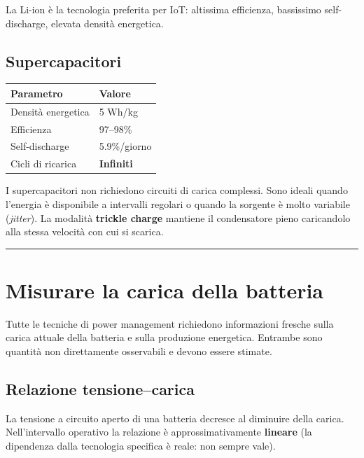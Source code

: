 \documentclass[
  italian,
  openany]{book}
\newcounter{none} %
\begin{document}
La Li-ion è la tecnologia preferita per IoT: altissima efficienza,
bassissimo self-discharge, elevata densità energetica.

\subsection{Supercapacitori}\label{supercapacitori}

{\def\LTcaptype{none} %
\begin{longtable}[]{@{}ll@{}}
\toprule\noalign{}
Parametro & Valore \\
\midrule\noalign{}
\endhead
\bottomrule\noalign{}
\endlastfoot
Densità energetica & 5 Wh/kg \\
Efficienza & 97--98\% \\
Self-discharge & 5.9\%/giorno \\
Cicli di ricarica & \textbf{Infiniti} \\
\end{longtable}
}

I supercapacitori non richiedono circuiti di carica complessi. Sono
ideali quando l'energia è disponibile a intervalli regolari o quando la
sorgente è molto variabile (\emph{jitter}). La modalità \textbf{trickle
charge} mantiene il condensatore pieno caricandolo alla stessa velocità
con cui si scarica.

\begin{center}\rule{0.5\linewidth}{0.5pt}\end{center}

\section{Misurare la carica della
batteria}\label{misurare-la-carica-della-batteria}

Tutte le tecniche di power management richiedono informazioni fresche
sulla carica attuale della batteria e sulla produzione energetica.
Entrambe sono quantità non direttamente osservabili e devono essere
stimate.

\subsection{Relazione tensione--carica}\label{relazione-tensionecarica}

La tensione a circuito aperto di una batteria decresce al diminuire
della carica. Nell'intervallo operativo la relazione è
approssimativamente \textbf{lineare} (la dipendenza dalla tecnologia
specifica è reale: non sempre vale).
\end{document}
